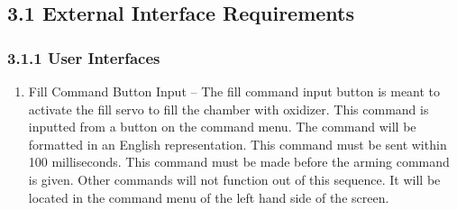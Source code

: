 \documentclass[10pt,draftclsnofoot,onecolumn]{IEEEtran}
\begin{document}
\subsection{3.1 External Interface Requirements}
\subsubsection{3.1.1 User Interfaces}
\begin{enumerate}
\item Fill Command Button Input –
The fill command input button is meant to activate the fill servo to fill the chamber with oxidizer. This command is inputted from a button on the command menu. The command will be formatted in an English representation.  This command must be sent within 100 milliseconds. This command must be made before the arming command is given. Other commands will not function out of this sequence. It will be located in the command menu of the left hand side of the screen.


\end{enumerate}
\end{document}
